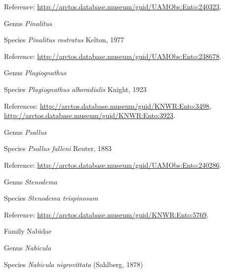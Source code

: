 \documentclass[9pt, article]{memoir}
\begin{document}
\begin{multicols}{2}
Reference: 
\url{http://arctos.database.museum/guid/UAMObs:Ento:240323}.

\vspace{6pt}\noindent\hspace{30pt}Genus \textit{Pinalitus}


\vspace{6pt}\noindent\hspace{36pt}Species \textit{Pinalitus rostratus} Kelton, 1977


Reference: 
\url{http://arctos.database.museum/guid/UAMObs:Ento:238678}.

\vspace{6pt}\noindent\hspace{30pt}Genus \textit{Plagiognathus}


\vspace{6pt}\noindent\hspace{36pt}Species \textit{Plagiognathus alboradialis} Knight, 1923


References: 
\url{http://arctos.database.museum/guid/KNWR:Ento:3498}, 
\url{http://arctos.database.museum/guid/KNWR:Ento:3923}.

\vspace{6pt}\noindent\hspace{30pt}Genus \textit{Psallus}


\vspace{6pt}\noindent\hspace{36pt}Species \textit{Psallus falleni} Reuter, 1883


Reference: 
\url{http://arctos.database.museum/guid/UAMObs:Ento:240286}.

\vspace{6pt}\noindent\hspace{30pt}Genus \textit{Stenodema}


\vspace{6pt}\noindent\hspace{36pt}Species \textit{Stenodema trispinosum}


Reference: 
\url{http://arctos.database.museum/guid/KNWR:Ento:5769}.

\vspace{6pt}\noindent\hspace{24pt}Family Nabidae


\vspace{6pt}\noindent\hspace{30pt}Genus \textit{Nabicula}


\vspace{6pt}\noindent\hspace{36pt}Species \textit{Nabicula nigrovittata} (Sahlberg, 1878)



\end{multicols}
\end{document}
